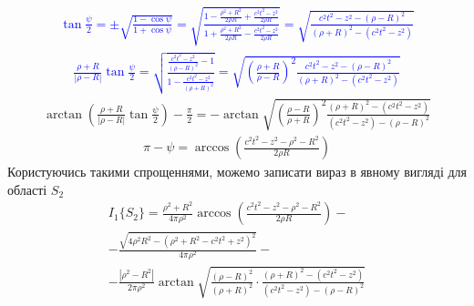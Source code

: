 %
\textcolor{blue}{ \begin{equation*} \begin{aligned}
\tan \frac{\psi}{2} = \pm \sqrt{ \frac{1 - \cos \psi}{1 + \cos \psi} } = 
\sqrt{ \frac{1- \frac{\rho^2 + R^2}{2 \rho R} + \frac{c^2 t^2 - z^2}{2 \rho R}}
{1 + \frac{\rho^2 + R^2}{2 \rho R} - \frac{c^2 t^2 - z^2}{2 \rho R}} } =
\sqrt{ \frac{c^2t^2 - z^2 - \left( \rho - R \right)^2}
{\left( \rho + R \right)^2 - \left( c^2t^2 - z^2 \right)} }
\end{aligned} \end{equation*} }
%
\textcolor{blue}{ \begin{equation*} \begin{aligned}
\frac{\rho + R}{ |\rho - R| } \tan \frac{\psi}{2} = 
\sqrt{ \frac{ \frac{c^2t^2 - z^2}{\left( \rho - R \right)^2} - 1}
{ 1 - \frac{c^2t^2 - z^2}{\left( \rho + R \right)^2} } } = 
\sqrt{ \left( \frac{\rho + R}{\rho - R} \right)^2
\frac{c^2t^2 - z^2 - \left( \rho - R \right)^2}
{\left( \rho + R \right)^2 - \left( c^2t^2 - z^2 \right)} }
\end{aligned} \end{equation*} }
%
\begin{equation*} \begin{aligned}
\arctan \left( \frac{\rho + R}{ |\rho - R| } \tan \frac{\psi}{2} \right) - 
\frac{\pi}{2} = - \arctan \sqrt{ \left( \frac{\rho - R}{\rho + R} \right)^2
\frac{\left( \rho + R \right)^2 - \left( c^2t^2 - z^2 \right)} 
{\left( c^2t^2 - z^2 \right) - \left( \rho - R \right)^2} }
\end{aligned} \end{equation*}
%
\begin{equation*} \begin{aligned}
\pi - \psi = \arccos \left( \frac{c^2 t^2 - z^2 - \rho^2 - R^2}{2 \rho R} \right)
\end{aligned} \end{equation*}
%
Користуючись такими спрощеннями, можемо записати вираз в явному вигляді для 
області $ S_2 $
%
\begin{equation*} \begin{aligned}
I_1 \{ S_2 \} = \frac{\rho^2 + R^2}{4 \pi \rho^2} \arccos 
\left( \frac{c^2 t^2 - z^2 - \rho^2 - R^2}{2 \rho R} \right) - \\
- \frac{\sqrt{4 \rho^2 R^2 - (\rho^2 + R^2 - c^2t^2 + z^2)^2}}{4 \pi \rho^2} - \\
- \frac{ |\rho^2 - R^2| }{2 \pi \rho^2} 
\arctan \sqrt{ \frac{(\rho - R)^2}{(\rho + R)^2} \cdot
\frac{\left( \rho + R \right)^2 - \left( c^2t^2 - z^2 \right)} 
{\left( c^2t^2 - z^2 \right) - \left( \rho - R \right)^2} }
\end{aligned} \end{equation*}

